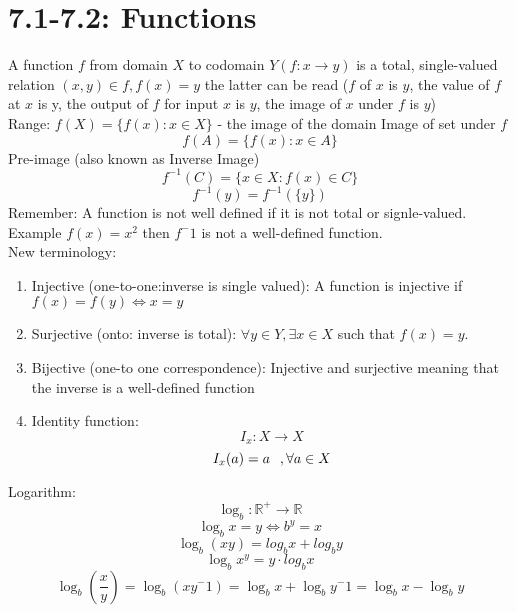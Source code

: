 \documentclass[12pt,letterpaper, onecolumn]{exam}
\begin{document}
	\section{7.1-7.2: Functions}
	A function $f$ from domain $X$ to codomain $Y (f:x \rightarrow y)$ is a total, single-valued relation $(x,y)\in f, f(x)=y$ the latter can be read ($f$ of $x$ is $y$, the value of $f$ at $x$ is y, the output of $f$ for input $x$ is $y$, the image of $x$ under $f$ is $y$)\\
	Range: $f(X)=\{f(x):x\in X\}$ - the image of the domain 
	Image of set under $f$\\
	$$f(A)=\{f(x):x\in A\}$$
	Pre-image (also known as Inverse Image)
	$$f^{-1}(C)=\{x\in X:f(x)\in C\}$$
	$$f^{-1}(y)=f^{-1}(\{y\})$$
	Remember: A function is not well defined if it is not total or signle-valued. Example $f(x)=x^2$ then $f^-1$ is not a well-defined function.\\
	New terminology:
	\begin{enumerate}
		\item Injective (one-to-one:inverse is single valued): A function is injective if $f(x)=f(y)\Leftrightarrow x=y$
		\item Surjective (onto: inverse is total): $\forall y\in Y, \exists x \in X$ such that $f(x)=y$.
		\item Bijective (one-to one correspondence): Injective and surjective meaning that the inverse is a well-defined function
		\item Identity function: $$I_x:X\rightarrow X$$ $$I_x(a)=a\hspace*{0.25cm},\forall a\in X$$
	\end{enumerate}
	Logarithm:\\
	$$\log_b:\mathbb{R^+}\rightarrow \mathbb{R}$$
	$$\log_b x=y \Leftrightarrow b^y=x$$
	$$\log_b (xy)=log_b x+log_b y$$
	$$\log_b x^y=y\cdot log_b x$$
	$$\log_b \left(\frac{x}{y}\right)=\log_b(xy^-1)=\log_b x+\log_b y^-1=\log_b x-\log_b y$$
	$$$$
\end{document}
